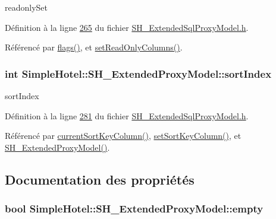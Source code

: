 readonly\-Set 



Définition à la ligne \hyperlink{SH__ExtendedSqlProxyModel_8h_source_l00265}{265} du fichier \hyperlink{SH__ExtendedSqlProxyModel_8h_source}{S\-H\-\_\-\-Extended\-Sql\-Proxy\-Model.\-h}.



Référencé par \hyperlink{classSimpleHotel_1_1SH__ExtendedProxyModel_a13db609799a6c190772602574d0a8d7a}{flags()}, et \hyperlink{classSimpleHotel_1_1SH__ExtendedProxyModel_a452dd45c56f8cfde44e1261b597f169b}{set\-Read\-Only\-Columns()}.

\hypertarget{classSimpleHotel_1_1SH__ExtendedProxyModel_a49e63382c2c5e09f8e4ae0b288513d0a}{
\subsubsection[{sort\-Index}]{\setlength{\rightskip}{0pt plus 5cm}int Simple\-Hotel\-::\-S\-H\-\_\-\-Extended\-Proxy\-Model\-::sort\-Index\hspace{0.3cm}{\ttfamily [private]}}}\label{classSimpleHotel_1_1SH__ExtendedProxyModel_a49e63382c2c5e09f8e4ae0b288513d0a}


sort\-Index 



Définition à la ligne \hyperlink{SH__ExtendedSqlProxyModel_8h_source_l00281}{281} du fichier \hyperlink{SH__ExtendedSqlProxyModel_8h_source}{S\-H\-\_\-\-Extended\-Sql\-Proxy\-Model.\-h}.



Référencé par \hyperlink{classSimpleHotel_1_1SH__ExtendedProxyModel_a2acd8779c72617f4b6a195ee9341b28b}{current\-Sort\-Key\-Column()}, \hyperlink{classSimpleHotel_1_1SH__ExtendedProxyModel_a901f2d931216126e6769482d91f02fa0}{set\-Sort\-Key\-Column()}, et \hyperlink{classSimpleHotel_1_1SH__ExtendedProxyModel_a67be298376a1c82cc96b7789bb6b301c}{S\-H\-\_\-\-Extended\-Proxy\-Model()}.



\subsection{Documentation des propriétés}
\hypertarget{classSimpleHotel_1_1SH__ExtendedProxyModel_a45f47ab859c5443353977e22417de357}{
\subsubsection[{empty}]{\setlength{\rightskip}{0pt plus 5cm}bool Simple\-Hotel\-::\-S\-H\-\_\-\-Extended\-Proxy\-Model\-::empty\hspace{0.3cm}{\ttfamily [read]}}}\label{classSimpleHotel_1_1SH__ExtendedProxyModel_a45f47ab859c5443353977e22417de357}


